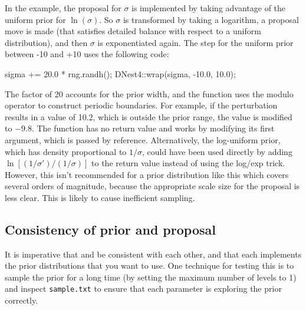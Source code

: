 \documentclass[article, nojss]{jss}
\begin{document}
In the example, the proposal for $\sigma$ is implemented by taking advantage
of the uniform prior for $\ln(\sigma)$. So $\sigma$ is transformed by
taking a logarithm, a proposal move is made (that satisfies detailed balance
with respect to a uniform distribution), and then $\sigma$ is exponentiated
again. The step for the uniform prior between -10 and +10
uses the following code:
\begin{CodeChunk}
\begin{CodeInput}
sigma += 20.0 * rng.randh();
DNest4::wrap(sigma, -10.0, 10.0);
\end{CodeInput}
\end{CodeChunk}
The factor of 20 accounts for the prior width, and
the  function uses the modulo operator
to construct periodic boundaries. For example, if the perturbation results
in a value of 10.2, which is outside the prior range, the value is modified to
$-9.8$.
The  function has no return value and works by modifying its
first argument, which is passed by reference.
Alternatively, the log-uniform prior, which has density proportional
to $1/\sigma$, could have been used directly by adding
$\ln\left[(1/\sigma')/(1/\sigma)\right]$ to the
return value instead of using the log/exp trick.
However, this isn't recommended for a prior distribution like this
which covers several orders of magnitude, because the appropriate scale size
for the proposal is less clear. This is likely to cause inefficient
sampling.

\subsection{Consistency of prior and proposal}
It is imperative that  and
be consistent with each other, and that each implements
the prior distributions that you want to use. One technique
for testing this is to sample the prior for a long time
(by setting the maximum number of levels to 1) and inspect
{\tt sample.txt} to ensure that each parameter is exploring
the prior correctly.
\end{document}
